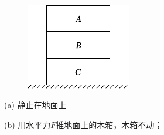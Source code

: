 \begin{questions}
  \begin{figure}[h]
    \vspace{-0.5em}
    \centering
     \hspace{4em}
    \setcounter{subfigure}{2}
    \\
    \setcounter{subfigure}{1}
     \hspace{4em}
    \setcounter{subfigure}{3}
    \caption{}
    \label{fig:03.18}
    \vspace{-0.5em}
  \end{figure}

  \begin{figure}
    \centering
    \includegraphics{figure/fig03.19}
    \caption{}
    \label{fig:03.19}
  \end{figure}
  (a) 静止在地面上

  (b) 用水平力$ F $推地面上的木箱，木箱不动；


\end{questions}
